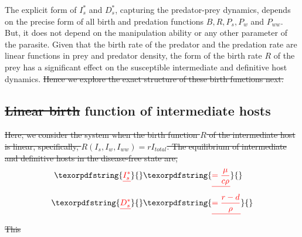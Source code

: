 \documentclass[a4paper]{scrartcl} %
\providecommand{\DIFaddtex}[1]{{\protect\color{blue}\uwave{#1}}} %
\providecommand{\DIFdeltex}[1]{{\protect\color{red}\sout{#1}}}                      %
\providecommand{\DIFaddbegin}{} %
\providecommand{\DIFaddend}{} %
\providecommand{\DIFdelbegin}{} %
\providecommand{\DIFdelend}{} %
\providecommand{\DIFadd}[1]{\texorpdfstring{\DIFaddtex{#1}}{#1}} %
\providecommand{\DIFdel}[1]{\texorpdfstring{\DIFdeltex{#1}}{}} %
\newcommand{\DIFscaledelfig}{0.5}
\newlength{\DIFdelgraphicswidth} %
\newlength{\DIFdelgraphicsheight} %
\newcommand{\DIFaddincludegraphics}[2][]{{\color{blue}\fbox{\DIFOincludegraphics[#1]{#2}}}} %
\newcommand{\DIFdelincludegraphics}[2][]{%
\sbox{\DIFdelgraphicsbox}{\DIFOincludegraphics[#1]{#2}}%
\settoboxwidth{\DIFdelgraphicswidth}{\DIFdelgraphicsbox} %
\settoboxtotalheight{\DIFdelgraphicsheight}{\DIFdelgraphicsbox} %
\scalebox{\DIFscaledelfig}{%
\parbox[b]{\DIFdelgraphicswidth}{\usebox{\DIFdelgraphicsbox}\\[-\baselineskip] \rule{\DIFdelgraphicswidth}{0em}}\llap{\resizebox{\DIFdelgraphicswidth}{\DIFdelgraphicsheight}{%
\setlength{\unitlength}{\DIFdelgraphicswidth}%
\begin{picture}(1,1)%
\thicklines\linethickness{2pt} %
{\color[rgb]{1,0,0}\put(0,0){\framebox(1,1){}}}%
{\color[rgb]{1,0,0}\put(0,0){\line( 1,1){1}}}%
{\color[rgb]{1,0,0}\put(0,1){\line(1,-1){1}}}%
\end{picture}%
}\hspace*{3pt}}} %
} %
\DeclareRobustCommand{\DIFaddbegin}{\DIFOaddbegin \let\includegraphics\DIFaddincludegraphics} %
\DeclareRobustCommand{\DIFaddend}{\DIFOaddend \let\includegraphics\DIFOincludegraphics} %
\DeclareRobustCommand{\DIFdelbegin}{\DIFOdelbegin \let\includegraphics\DIFdelincludegraphics} %
\DeclareRobustCommand{\DIFdelend}{\DIFOaddend \let\includegraphics\DIFOincludegraphics} %
\begin{document}
The explicit form of $I_s^*$ and $D_s^*$, capturing the predator-prey dynamics, depends on the precise form of all birth and predation functions $B, R, P_s, P_w$ and $P_{ww}$.
But, it does not depend on the manipulation ability or any other parameter of the parasite. 
Given that the birth rate of the predator and the predation rate are linear functions in prey and predator density, the form of the birth rate $R$ of the prey has a significant effect on the susceptible intermediate and definitive host dynamics.
\DIFdelbegin \DIFdel{Hence we explore the exact structure of these birth functions next.
}\DIFdelend 

\subsection*{\DIFdelbegin \DIFdel{Linear birth }\DIFdelend \DIFaddbegin \DIFadd{Birth }\DIFaddend function of intermediate hosts}
\DIFdelbegin \DIFdel{Here, we consider the system when the birth function $R$ of the intermediate host is linear, specifically, $R(I_s, I_w, I_{ww}) = r I_{total}$. 
The equilibrium of intermediate and definitive hosts in the disease-free state are,
}\begin{align*}
 \DIFdel{I_s^* }&\DIFdel{= \frac{\mu}{c \rho} }\\
 \DIFdel{D_s^* }&\DIFdel{= \frac{r - d}{\rho}
}\end{align*}%
\DIFdel{This }\DIFdelend \DIFaddbegin 
\end{document}

